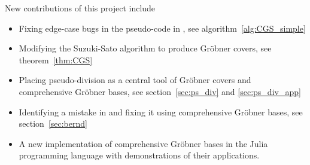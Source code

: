 New contributions of this project include
\begin{itemize}
  \item Fixing edge-case bugs in the pseudo-code in \cite{ss_algo}, see algorithm~\ref{alg:CGS_simple}
  \item Modifying the Suzuki-Sato algorithm to produce Gröbner covers, see theorem~\ref{thm:CGS}
  \item Placing pseudo-division as a central tool of Gröbner covers and comprehensive Gröbner bases, see section~\ref{sec:ps_div} and \ref{sec:ps_div_app}
  \item Identifying a mistake in \cite{sturmfels} and fixing it using comprehensive Gröbner bases, see section~\ref{sec:bernd}
  \item A new implementation of comprehensive Gröbner bases in the Julia programming language with demonstrations of their applications.
\end{itemize}
